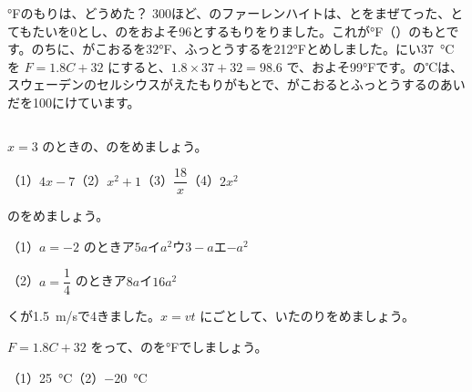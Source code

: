 \begin{column}{°Fのもりは、どうめた？}
300ほど、のファーレンハイトは、とをまぜてった、とてもたいを0とし、のをおよそ96とするもりをりました。これが°F（）のもとです。のちに、がこおるを32°F、ふっとうするを212°Fとめしました。にい\qty{37}{\degreeCelsius}を $F=1.8C+32$ にすると、$1.8\times37+32=98.6$ で、およそ99°Fです。の℃は、スウェーデンのセルシウスがえたもりがもとで、がこおるとふっとうするのあいだを100にけています。
\end{column}

\bkendproblems
{}

\bkproblem $x=3$ のときの、のをめましょう。\par
（1）\nobreak $4x-7$\quad（2）\nobreak $x^2+1$\quad（3）\nobreak $\dfrac{18}{x}$\quad（4）\nobreak $2x^2$

\bkproblem {}のをめましょう。\par
（1）\nobreak $a=-2$ のとき\enspace ア\enspace $5a$\quad イ\enspace $a^2$\quad ウ\enspace $3-a$\quad エ\enspace $-a^2$\par
（2）\nobreak $a=\dfrac{1}{4}$ のとき\enspace ア\enspace $8a$\quad イ\enspace $16a^2$

\bkproblem {}くが\qty{1.5}{m/s}で4きました。$x=vt$ にごとして、いたのりをめましょう。

\bkproblem $F=1.8C+32$ をって、のを°Fでしましょう。\par
（1）\nobreak \qty{25}{\degreeCelsius}\quad（2）\nobreak \qty{-20}{\degreeCelsius}

